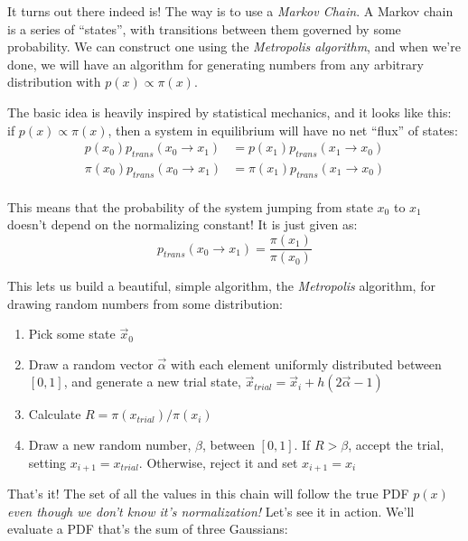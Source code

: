\documentclass{article}
\theoremstyle{demo}
\begin{document}
It turns out there indeed is!  The way is to use a \textit{Markov Chain}.  A
Markov chain is a series of ``states'', with transitions between them governed
by some probability.  We can construct one using the \textit{Metropolis
algorithm}, and when we're done, we will have an algorithm for generating
numbers from any arbitrary distribution with $p(x)\propto\pi(x)$.  

The basic idea is heavily inspired by statistical mechanics, and it looks like
this: if $p(x)\propto\pi(x)$, then a system in equilibrium will have no net
``flux'' of states:
\begin{equation}
    \begin{aligned}
        p(x_0)p_{trans}(x_0 \rightarrow x_1) &= p(x_1)p_{trans}(x_1 \rightarrow
        x_0) \\
        \pi(x_0)p_{trans}(x_0 \rightarrow x_1) &= \pi(x_1)p_{trans}(x_1 \rightarrow
        x_0) \\
    \end{aligned}
\end{equation}

This means that the probability of the system jumping from state $x_0$ to $x_1$
doesn't depend on the normalizing constant!  It is just given as:
\begin{equation}
    p_{trans}(x_0 \rightarrow x_1) = \frac{\pi(x_1)}{\pi(x_0)}
\end{equation}

This lets us build a beautiful, simple algorithm, the \textit{Metropolis}
algorithm, for drawing random numbers from some distribution:

\begin{enumerate}
    \item Pick some state $\vec x_0$
    \item Draw a random vector $\vec \alpha$ with each element uniformly
        distributed between $[0,1]$, and generate a new trial state,
        $\vec x_{trial} = \vec x_i + h(2\vec\alpha -1)$
    \item Calculate $R=\pi(x_{trial})/\pi(x_i)$
    \item Draw a new random number, $\beta$, between $[0,1]$.  If $R>\beta$,
        accept the trial, setting $x_{i+1} = x_{trial}$.  Otherwise, reject it
        and set $x_{i+1} = x_i$
\end{enumerate}

That's it! The set of all the values in this chain will follow the true PDF
$p(x)$ \textit{even though we don't know it's normalization!} Let's see it in
action.  We'll evaluate a PDF that's the sum of three Gaussians:
\end{document}
